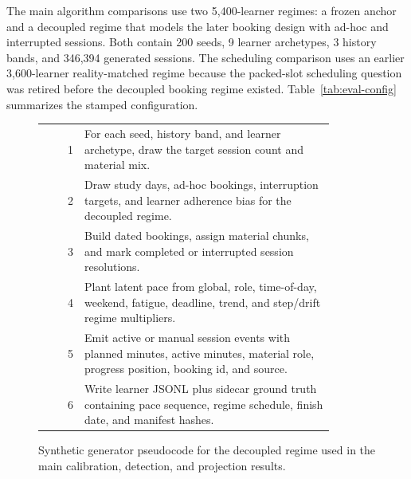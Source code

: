 \documentclass[conference]{IEEEtran}
\begin{document}
The main algorithm comparisons use two 5{,}400-learner regimes: a frozen anchor and a decoupled regime that models the later booking design with ad-hoc and interrupted sessions. Both contain 200 seeds, 9 learner archetypes, 3 history bands, and 346{,}394 generated sessions. The scheduling comparison uses an earlier 3{,}600-learner reality-matched regime because the packed-slot scheduling question was retired before the decoupled booking regime existed. Table~\ref{tab:eval-config} summarizes the stamped configuration.

\begin{figure}[!t]
\centering
\scriptsize
\begin{tabular}{@{}r p{0.86\linewidth}@{}}
1 & For each seed, history band, and learner archetype, draw the target session count and material mix. \\
2 & Draw study days, ad-hoc bookings, interruption targets, and learner adherence bias for the decoupled regime. \\
3 & Build dated bookings, assign material chunks, and mark completed or interrupted session resolutions. \\
4 & Plant latent pace from global, role, time-of-day, weekend, fatigue, deadline, trend, and step/drift regime multipliers. \\
5 & Emit active or manual session events with planned minutes, active minutes, material role, progress position, booking id, and source. \\
6 & Write learner JSONL plus sidecar ground truth containing pace sequence, regime schedule, finish date, and manifest hashes. \\
\end{tabular}
\caption{Synthetic generator pseudocode for the decoupled regime used in the main calibration, detection, and projection results.}
\label{fig:synthetic-generator}
\end{figure}
\end{document}
